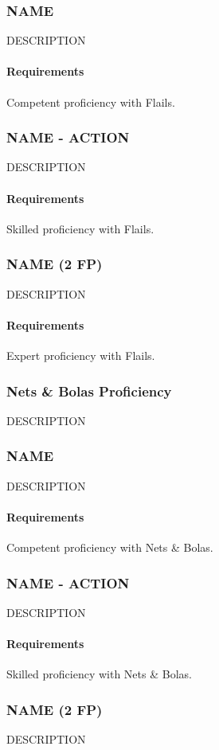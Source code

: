 \subsubsection{NAME} \label{feat::name}
    DESCRIPTION
    \paragraph{Requirements} Competent proficiency with Flails.
\subsubsection{NAME - ACTION} \label{feat::name}
    DESCRIPTION
    \paragraph{Requirements} Skilled proficiency with Flails.
\subsubsection{NAME (2 FP)} \label{feat::name}
    DESCRIPTION
    \paragraph{Requirements} Expert proficiency with Flails.
\subsubsection{Nets \& Bolas Proficiency} \label{feat::name}
    DESCRIPTION
\subsubsection{NAME} \label{feat::name}
    DESCRIPTION
    \paragraph{Requirements} Competent proficiency with Nets \& Bolas.
\subsubsection{NAME - ACTION} \label{feat::name}
    DESCRIPTION
    \paragraph{Requirements} Skilled proficiency with Nets \& Bolas.
\subsubsection{NAME (2 FP)} \label{feat::name}
    DESCRIPTION
